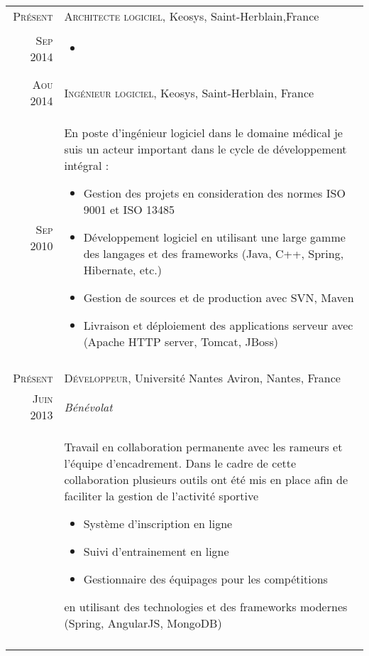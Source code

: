 \documentclass[letter,10pt]{article} %
\begin{document}
\begin{tabular}{r|p{13.5cm}}
\textsc{Pr\'{e}sent} & \textsc{Architecte logiciel}, Keosys,
Saint-Herblain,France \\
\textsc{Sep 2014} & \vspace{-1mm} 
\begin{itemize} 
  \item 

\end{itemize} \\
\multicolumn{2}{c}{} \\
\textsc{Aou 2014} & \textsc{Ing\'{e}nieur logiciel}, Keosys, Saint-Herblain,
France
\\
\textsc{Sep 2010} & \vspace{-1mm} En poste d'ing\'{e}nieur logiciel dans le domaine m\'{e}dical je suis un acteur important dans le cycle de d\'{e}veloppement int\'{e}gral : 
\begin{itemize} 
\item Gestion des projets en consideration des normes ISO 9001 et ISO 13485  
\item D\'{e}veloppement logiciel en utilisant une large gamme des langages et des frameworks (Java, C++, Spring, Hibernate, etc.) 
\item Gestion de sources et de production avec SVN, Maven 
\item Livraison et d\'{e}ploiement des applications serveur avec (Apache HTTP server, Tomcat, JBoss)
\end{itemize} \\
\multicolumn{2}{c}{} \\


\textsc{Pr\'{e}sent} & \textsc{D\'{e}veloppeur}, Universit\'{e} Nantes Aviron, Nantes, France \\
\textsc{Juin 2013} & \emph{B\'{e}n\'{e}volat} \\
& \vspace{-1mm}Travail en collaboration permanente avec les rameurs et l'\'{e}quipe d'encadrement. Dans le cadre de cette collaboration plusieurs outils ont \'{e}t\'{e} mis en place afin de faciliter la gestion de l'activit\'{e} sportive 
\begin{itemize}
\item Syst\`{e}me d'inscription en ligne
\item Suivi d'entrainement en ligne
\item Gestionnaire des \'{e}quipages pour les comp\'{e}titions 
\end{itemize}
en utilisant des technologies et des frameworks modernes (Spring, AngularJS, MongoDB) \\
\multicolumn{2}{c}{} \\



\end{tabular}
\end{document}
